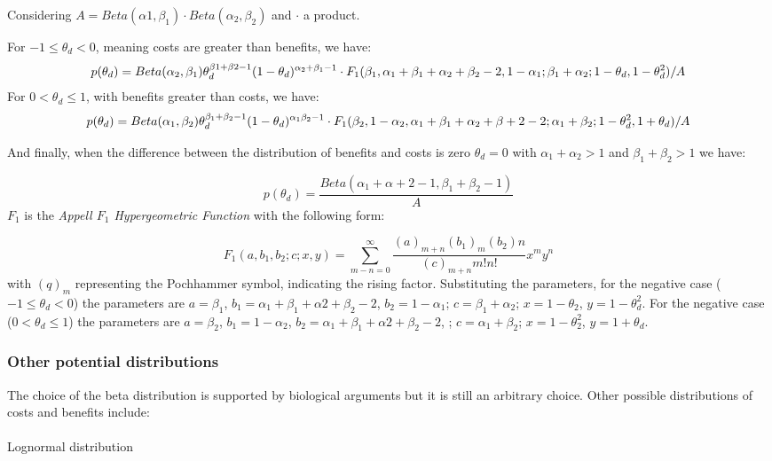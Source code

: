 \documentclass[
  letterpaper,
  DIV=11,
  numbers=noendperiod]{scrartcl}
\makeatletter
\let\oldparagraph\paragraph
\renewcommand{\paragraph}{
    \@ifstar
      \xxxParagraphStar
      \xxxParagraphNoStar
  }
\newcommand{\xxxParagraphStar}[1]{\oldparagraph*{#1}\mbox{}}
\newcommand{\xxxParagraphNoStar}[1]{\oldparagraph{#1}\mbox{}}
\makeatother
\begin{document}
Considering \(A = Beta(\alpha1, \beta_1) \cdot Beta(\alpha_2, \beta_2)\)
and \(\cdot\) a product.

For \(-1 \leq \theta_d < 0\), meaning costs are greater than benefits,
we have: \[
p(\theta_d) = Beta(\alpha_2, \beta_1)\theta_d^{\beta1+\beta2-1}(1-\theta_d)^{\alpha_2+\beta_1-1} \cdot \\
                F_1(\beta_1, \alpha_1+\beta_1+\alpha_2+\beta_2-2, 1-\alpha_1; \beta_1+\alpha_2; 1-\theta_d, 1-\theta_d^2)/A
\] For \(0 < \theta_d \leq 1\), with benefits greater than costs, we
have: \[
p(\theta_d) = Beta(\alpha_1, \beta_2)\theta_d^{\beta_1+\beta_2-1}(1-\theta_d)^{\alpha_1\beta_2-1} \cdot \\
                F_1(\beta_2, 1-\alpha_2, \alpha_1+\beta_1+\alpha_2+\beta+2-2; \alpha_1+\beta_2; 1-\theta_d^2, 1+\theta_d)/A
\]

And finally, when the difference between the distribution of benefits
and costs is zero \(\theta_d = 0\) with \(\alpha_1 + \alpha_2 >1\) and
\(\beta_1 + \beta_2 >1\) we have:

\[
  p(\theta_d) = \frac{Beta(\alpha_1 + \alpha+2 -1, \beta_1+\beta_2-1)}{A}
\] \(F_1\) is the \textit{Appell $F_1$ Hypergeometric Function} with the
following form:

\[
F_1(a, b_1, b_2; c;x,y) = \sum_{m-n=0}^\infty \frac{(a)_{m+n}(b_1)_m(b_2)n}{(c)_{m+n} m!n!}x^my^n
\] with \((q)_m\) representing the Pochhammer symbol, indicating the
rising factor. Substituting the parameters, for the negative case
(\(-1 \leq \theta_d < 0\)) the parameters are \(a=\beta_1\),
\(b_1 = \alpha_1+\beta_1+\alpha2+\beta_2-2\), \(b_2 = 1-\alpha_1\);
\(c = \beta_1+\alpha_2\); \(x=1-\theta_2\), \(y= 1-\theta_d^2\). For the
negative case (\(0 < \theta_d \leq 1\)) the parameters are
\(a=\beta_2\), \(b_1 = 1-\alpha_2\),
\(b_2 = \alpha_1+\beta_1+\alpha2+\beta_2-2\), ;
\(c = \alpha_1+\beta_2\); \(x=1-\theta_2^2\), \(y= 1+\theta_d\).

\subsubsection{Other potential
distributions}\label{other-potential-distributions}

The choice of the beta distribution is supported by biological arguments
but it is still an arbitrary choice. Other possible distributions of
costs and benefits include:

\paragraph{Lognormal distribution}\label{lognormal-distribution}
\end{document}
